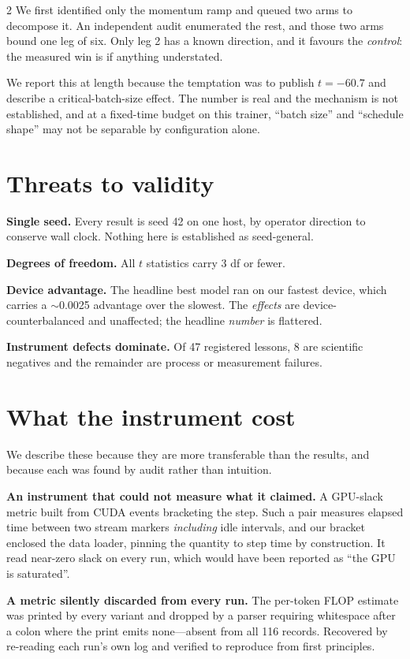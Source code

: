 \documentclass[10pt]{article}
\begin{document}
\begin{multicols}{2}
We first identified only the momentum ramp and queued two arms to decompose it. An
independent audit enumerated the rest, and those two arms bound one leg of six. Only leg
2 has a known direction, and it favours the \emph{control}: the measured win is if
anything understated.

We report this at length because the temptation was to publish $t=-60.7$ and describe a
critical-batch-size effect. The number is real and the mechanism is not established, and
at a fixed-time budget on this trainer, ``batch size'' and ``schedule shape'' may not be
separable by configuration alone.

\section{Threats to validity}

\textbf{Single seed.} Every result is seed 42 on one host, by operator direction to
conserve wall clock. Nothing here is established as seed-general.

\textbf{Degrees of freedom.} All $t$ statistics carry 3 df or fewer.

\textbf{Device advantage.} The headline best model ran on our fastest device, which
carries a $\sim$0.0025 advantage over the slowest. The \emph{effects} are
device-counterbalanced and unaffected; the headline \emph{number} is flattered.

\textbf{Instrument defects dominate.} Of 47 registered lessons, 8 are scientific negatives
and the remainder are process or measurement failures.

\section{What the instrument cost}
\label{sec:instrument}

We describe these because they are more transferable than the results, and because each
was found by audit rather than intuition.

\textbf{An instrument that could not measure what it claimed.} A GPU-slack metric built
from CUDA events bracketing the step. Such a pair measures elapsed time between two stream
markers \emph{including} idle intervals, and our bracket enclosed the data loader, pinning
the quantity to step time by construction. It read near-zero slack on every run, which
would have been reported as ``the GPU is saturated''.

\textbf{A metric silently discarded from every run.} The per-token FLOP estimate was
printed by every variant and dropped by a parser requiring whitespace after a colon where
the print emits none---absent from all 116 records. Recovered by re-reading each run's own
log and verified to reproduce from first principles.


\end{multicols}
\end{document}
